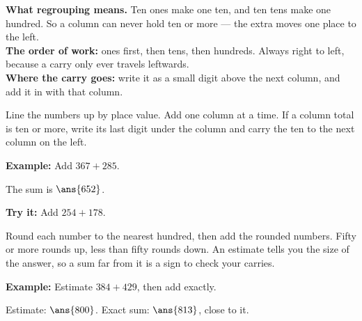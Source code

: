 \documentclass[12pt]{article}
\begin{document}

\begin{formulabox}
\textbf{What regrouping means.} Ten ones make one ten, and ten tens make one
hundred. So a column can never hold ten or more --- the extra moves one place
to the left.\\[3pt]
\textbf{The order of work:} ones first, then tens, then hundreds. Always right
to left, because a carry only ever travels leftwards.\\[3pt]
\textbf{Where the carry goes:} write it as a small digit above the next
column, and add it in with that column.
\end{formulabox}


\begin{formulabox}
Line the numbers up by place value. Add one column at a time. If a column
total is ten or more, write its last digit under the column and carry the ten
to the next column on the left.
\end{formulabox}

\begin{examplebox}
\textbf{Example:} Add $367 + 285$.

The sum is $\ans{652}$.
\end{examplebox}

\begin{tryitbox}
\textbf{Try it:} Add $254 + 178$.\\[2pt]
\end{tryitbox}


\begin{formulabox}
Round each number to the nearest hundred, then add the rounded numbers. Fifty
or more rounds up, less than fifty rounds down. An estimate tells you the size
of the answer, so a sum far from it is a sign to check your carries.
\end{formulabox}

\begin{examplebox}
\textbf{Example:} Estimate $384 + 429$, then add exactly.

Estimate: $\ans{800}$. \quad Exact sum: $\ans{813}$, close to it.
\end{examplebox}
\end{document}
